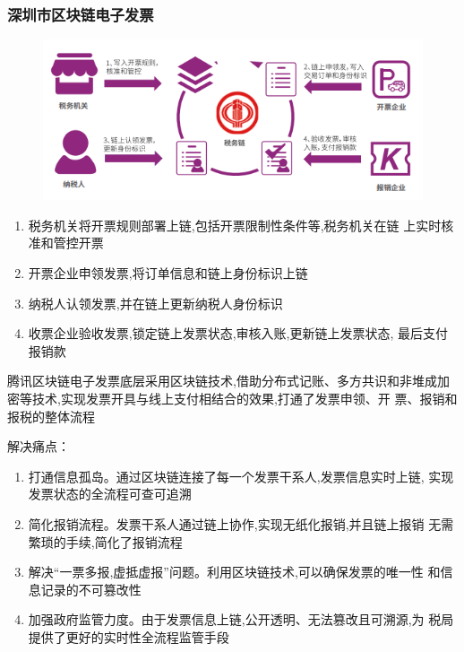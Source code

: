 \documentclass[11pt]{beamer}
\begin{document}
\begin{frame}[allowframebreaks]
	\frametitle{深圳市区块链电子发票}
	\begin{figure}
		\centering
		\includegraphics[width=0.6\linewidth]{figures/gov/8}
		\label{fig:8}
	\end{figure}
	{\footnotesize 	\begin{enumerate}
		\item 税务机关将开票规则部署上链,包括开票限制性条件等,税务机关在链
		      上实时核准和管控开票
		\item 开票企业申领发票,将订单信息和链上身份标识上链
		\item 纳税人认领发票,并在链上更新纳税人身份标识
		\item 收票企业验收发票,锁定链上发票状态,审核入账,更新链上发票状态,
		      最后支付报销款
	\end{enumerate}}
	{\footnotesize 	腾讯区块链电子发票底层采用区块链技术,借助分布式记账、多方共识和非堆成加密等技术,实现发票开具与线上支付相结合的效果,打通了发票申领、开
	票、报销和报税的整体流程}

	解决痛点：
	\begin{enumerate}
		\item 打通信息孤岛。通过区块链连接了每一个发票干系人,发票信息实时上链,
		      实现发票状态的全流程可查可追溯
		\item 简化报销流程。发票干系人通过链上协作,实现无纸化报销,并且链上报销
		      无需繁琐的手续,简化了报销流程
		\item 解决“一票多报,虚抵虚报”问题。利用区块链技术,可以确保发票的唯一性
		      和信息记录的不可篡改性
		\item 加强政府监管力度。由于发票信息上链,公开透明、无法篡改且可溯源,为
		      税局提供了更好的实时性全流程监管手段
	\end{enumerate}
\end{frame}
\end{document}
